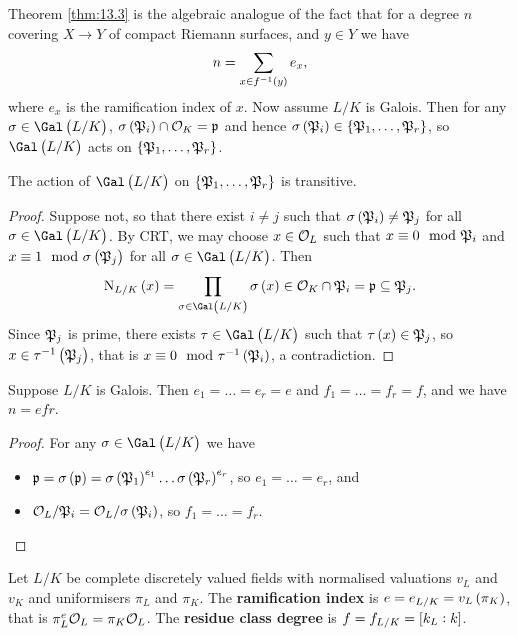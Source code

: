 Theorem \ref{thm:13.3} is the algebraic analogue of the fact that for a degree $ n $ covering $ X \to Y $ of compact Riemann surfaces, and $ y \in Y $ we have
$$ n = \sum_{x \in f^{-1}\br{y}} e_x, $$
where $ e_x $ is the ramification index of $ x $. Now assume $ L / K $ is Galois. Then for any $ \sigma \in \Gal\br{L / K} $, $ \sigma\br{\pp_i} \cap \OOO_K = \ppp $ and hence $ \sigma\br{\pp_i} \in \cbr{\pp_1, \dots, \pp_r} $, so $ \Gal\br{L / K} $ acts on $ \cbr{\pp_1, \dots, \pp_r} $.

\begin{proposition}
\label{prop:13.4}
The action of $ \Gal\br{L / K} $ on $ \cbr{\pp_1, \dots, \pp_r} $ is transitive.
\end{proposition}

\begin{proof}
Suppose not, so that there exist $ i \ne j $ such that $ \sigma\br{\pp_i} \ne \pp_j $ for all $ \sigma \in \Gal\br{L / K} $. By CRT, we may choose $ x \in \mathcal{O}_L $ such that $ x \equiv 0 \mod {\mathfrak{P}}_i $ and $ x \equiv 1 \mod \sigma\br{\pp_j} $ for all $ \sigma \in \Gal\br{L / K} $. Then
$$ \N_{L / K}\br{x} = \prod_{\sigma \in \Gal\br{L / K}} \sigma\br{x} \in \OOO_K \cap \pp_i = \ppp \subseteq \pp_j. $$
Since $ \mathfrak{P}_j $ is prime, there exists $ \tau \in \Gal\br{L / K} $ such that $ \tau\br{x} \in \pp_j $, so $ x \in \tau^{-1}\br{\pp_j} $, that is $ x \equiv 0 \mod \tau^{-1}\br{\pp_i} $, a contradiction.
\end{proof}

\pagebreak

\begin{corollary}
Suppose $ L / K $ is Galois. Then $ e_1 = \dots = e_r = e $ and $ f_1 = \dots = f_r = f $, and we have $ n = efr $.
\end{corollary}

\begin{proof}
For any $ \sigma \in \Gal\br{L / K} $ we have
\begin{itemize}
\item $ \ppp = \sigma\br{\ppp} = \sigma\br{\pp_1}^{e_1} \dots \sigma\br{\pp_r}^{e_r} $, so $ e_1 = \dots = e_r $, and
\item $ \OOO_L / \pp_i = \OOO_L / \sigma\br{\pp_i} $, so $ f_1 = \dots = f_r $.
\end{itemize}
\end{proof}

Let $ L / K $ be complete discretely valued fields with normalised valuations $ v_L $ and $ v_K $ and uniformisers $ \pi_L $ and $ \pi_K $. The \textbf{ramification index} is $ e = e_{L / K} = v_L\br{\pi_K} $, that is $ \pi_L^e\mathcal{O}_L = \pi_K\mathcal{O}_L $. The \textbf{residue class degree} is $ f = f_{L / K} = \sbr{k_L : k} $.

